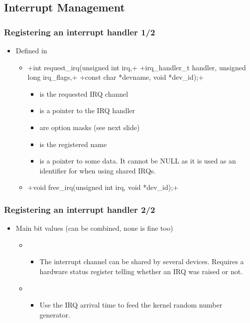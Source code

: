 \subsection{Interrupt Management}

\begin{frame}[fragile]
  \frametitle{Registering an interrupt handler 1/2}
  \begin{itemize}
  \item Defined in 
    \begin{itemize}
    \item {}+int request_irq(unsigned int irq,+
      +irq_handler_t handler, unsigned long irq_flags,+
      +const char *devname, void *dev_id);+
      \begin{itemize}
      \item {} is the requested IRQ channel
      \item {} is a pointer to the IRQ handler
      \item {} are option masks (see next slide)
      \item {} is the registered name
      \item {} is a pointer to some data. It cannot be NULL
        as it is used as an identifier for  when using
        shared IRQs.
      \end{itemize}
    \item {}+void free_irq(unsigned int irq, void *dev_id);+
    \end{itemize}
  \end{itemize}
\end{frame}

\begin{frame}
  \frametitle{Registering an interrupt handler 2/2}
  \begin{itemize}
  \item Main  bit values (can be combined, none is
    fine too)
    \begin{itemize}
    \item {}
      \begin{itemize}
      \item The interrupt channel can be shared by several
        devices. Requires a hardware status register telling whether
        an IRQ was raised or not.
      \end{itemize}
    \item {}
      \begin{itemize}
      \item Use the IRQ arrival time to feed the kernel random number
        generator.
      \end{itemize}
    \end{itemize}
  \end{itemize}
\end{frame}

